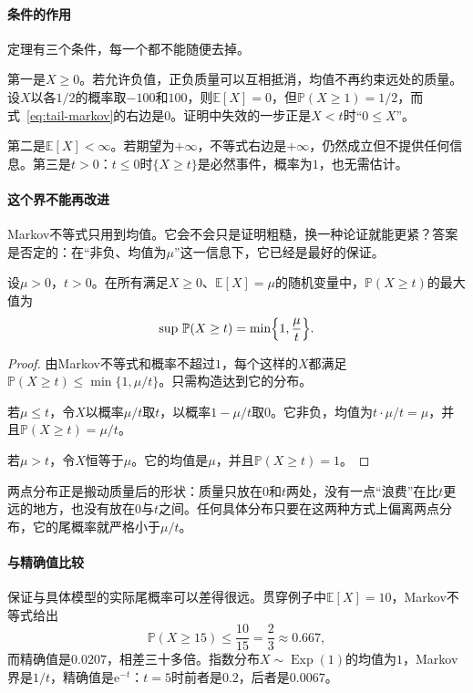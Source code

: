 \paragraph{条件的作用}
定理有三个条件，每一个都不能随便去掉。

第一是$X\geq0$。若允许负值，正负质量可以互相抵消，均值不再约束远处的质量。设$X$以各$1/2$的概率取$-100$和$100$，则$\mathbb{E}[X]=0$，但$\mathbb{P}(X\geq1)=1/2$，而式~\eqref{eq:tail-markov}的右边是$0$。证明中失效的一步正是$X<t$时“$0\leq X$”。

第二是$\mathbb{E}[X]<\infty$。若期望为$+\infty$，不等式右边是$+\infty$，仍然成立但不提供任何信息。第三是$t>0$：$t\leq0$时$\{X\geq t\}$是必然事件，概率为$1$，也无需估计。

\paragraph{这个界不能再改进}
Markov不等式只用到均值。它会不会只是证明粗糙，换一种论证就能更紧？答案是否定的：在“非负、均值为$\mu$”这一信息下，它已经是最好的保证。

\begin{theorem}[Markov界的最优性]
\label{thm:tail-markov-sharp}
设$\mu>0$，$t>0$。在所有满足$X\geq0$、$\mathbb{E}[X]=\mu$的随机变量中，$\mathbb{P}(X\geq t)$的最大值为
\begin{equation}
 \sup\,\mathbb{P}(X\geq t)=\min\Bigl\{1,\frac{\mu}{t}\Bigr\} .
 \label{eq:tail-markov-sharp}
\end{equation}
\end{theorem}

\begin{proof}
由Markov不等式和概率不超过$1$，每个这样的$X$都满足$\mathbb{P}(X\geq t)\leq\min\{1,\mu/t\}$。只需构造达到它的分布。

若$\mu\leq t$，令$X$以概率$\mu/t$取$t$，以概率$1-\mu/t$取$0$。它非负，均值为$t\cdot\mu/t=\mu$，并且$\mathbb{P}(X\geq t)=\mu/t$。

若$\mu>t$，令$X$恒等于$\mu$。它的均值是$\mu$，并且$\mathbb{P}(X\geq t)=1$。
\end{proof}

两点分布正是搬动质量后的形状：质量只放在$0$和$t$两处，没有一点“浪费”在比$t$更远的地方，也没有放在$0$与$t$之间。任何具体分布只要在这两种方式上偏离两点分布，它的尾概率就严格小于$\mu/t$。

\paragraph{与精确值比较}
保证与具体模型的实际尾概率可以差得很远。贯穿例子中$\mathbb{E}[X]=10$，Markov不等式给出
\[
 \mathbb{P}(X\geq15)\leq\frac{10}{15}=\frac23\approx0.667 ,
\]
而精确值是$0.0207$，相差三十多倍。指数分布$X\sim\operatorname{Exp}(1)$的均值为$1$，Markov界是$1/t$，精确值是$\mathrm{e}^{-t}$：$t=5$时前者是$0.2$，后者是$0.0067$。

